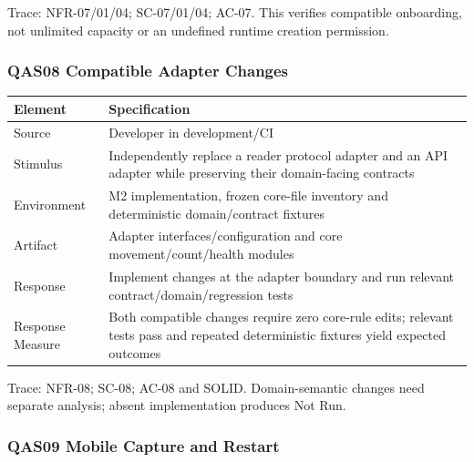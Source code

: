 Trace: NFR-07/01/04; SC-07/01/04; AC-07. This verifies compatible
onboarding, not unlimited capacity or an undefined runtime creation
permission.

\subsubsection{QAS08 Compatible Adapter Changes}\label{sec:3.4.8}

{\small
\begin{longtable}[]{|>{\raggedright\arraybackslash}p{}|>{\raggedright\arraybackslash}p{}|}
\hline
\textbf{Element} & \textbf{Specification} \\ \hline
\endhead
Source & Developer in development/CI \\ \hline
Stimulus & Independently replace a reader protocol adapter and an API
adapter while preserving their domain-facing contracts \\ \hline
Environment & M2 implementation, frozen core-file inventory and
deterministic domain/contract fixtures \\ \hline
Artifact & Adapter interfaces/configuration and core
movement/count/health modules \\ \hline
Response & Implement changes at the adapter boundary and run relevant
contract/domain/regression tests \\ \hline
Response Measure & Both compatible changes require zero core-rule edits;
relevant tests pass and repeated deterministic fixtures yield expected
outcomes \\ \hline
\end{longtable}
}

Trace: NFR-08; SC-08; AC-08 and SOLID. Domain-semantic changes need
separate analysis; absent implementation produces Not Run.

\newpage
\subsubsection{QAS09 Mobile Capture and Restart}\label{sec:qas09}

